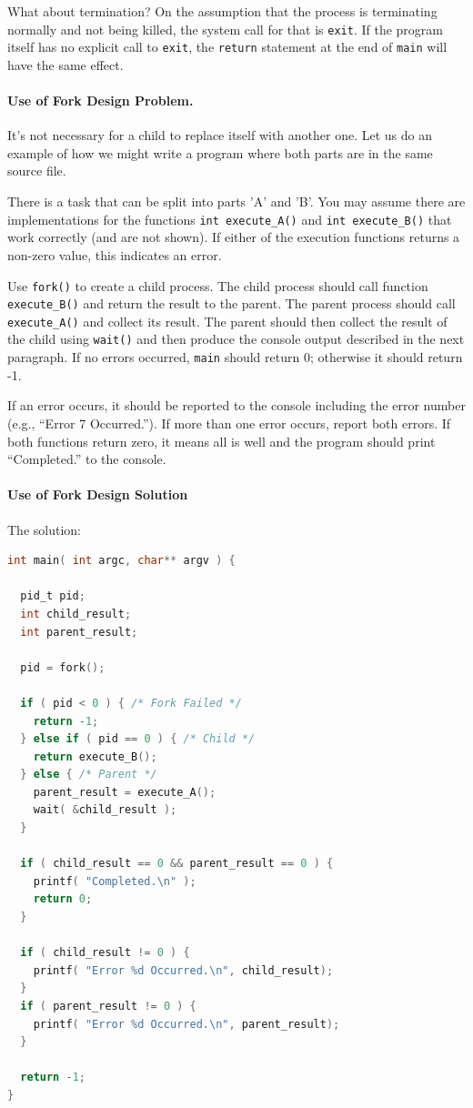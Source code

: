 \documentclass[a4paper]{report}
\begin{document}
What about termination? On the assumption that the process is terminating normally and not being killed, the system call for that is \texttt{exit}. If the program itself has no explicit call to \texttt{exit}, the \texttt{return} statement at the end of \texttt{main} will have the same effect.

\paragraph{Use of Fork Design Problem. }
It's not necessary for a child to replace itself with another one. Let us do an example of how we might write a program where both parts are in the same source file.

There is a task that can be split into parts 'A' and 'B'. You may assume there are implementations for the functions \texttt{int execute\_A()} and \texttt{int execute\_B()} that work correctly (and are not shown). If either of the execution functions returns a non-zero value, this indicates an error.

Use \texttt{fork()} to create a child process. The child process should call function \texttt{execute\_B()} and return the result to the parent. The parent process should call \texttt{execute\_A()} and collect its result. The parent should then collect the result of the child using \texttt{wait()} and then produce the console output described in the next paragraph. If no errors occurred, \texttt{main} should return 0; otherwise it should return -1.

If an error occurs, it should be reported to the console including the error number (e.g., ``Error 7 Occurred.''). If more than one error occurs, report both errors. If both functions return zero, it means all is well and the program should print ``Completed.'' to the console.

\paragraph{Use of Fork Design Solution} The solution:

\begin{lstlisting}[language=C]
int main( int argc, char** argv ) {

  pid_t pid;
  int child_result;
  int parent_result;

  pid = fork();
  
  if ( pid < 0 ) { /* Fork Failed */
    return -1;
  } else if ( pid == 0 ) { /* Child */
    return execute_B();
  } else { /* Parent */ 
    parent_result = execute_A();
    wait( &child_result );
  }
  
  if ( child_result == 0 && parent_result == 0 ) {
    printf( "Completed.\n" );
    return 0;
  }
  
  if ( child_result != 0 ) {
    printf( "Error %d Occurred.\n", child_result);
  }
  if ( parent_result != 0 ) {
    printf( "Error %d Occurred.\n", parent_result);
  }
  
  return -1;
}
\end{lstlisting}
\end{document}
